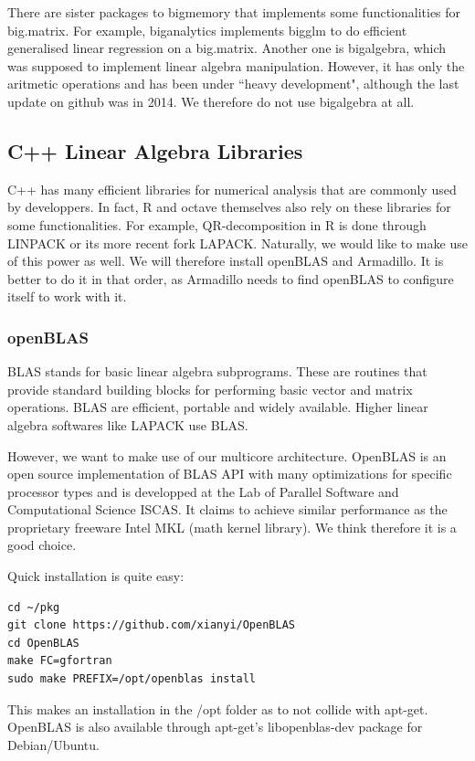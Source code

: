 \documentclass[a4paper,11pt]{amsart}
\begin{document}
There are sister packages to bigmemory that implements some functionalities for big.matrix. For example, biganalytics implements bigglm to do efficient generalised linear regression on a big.matrix. Another one is bigalgebra, which was supposed to implement linear algebra manipulation. However, it has only the aritmetic operations and has been under ``heavy development", although the last update on github was in 2014. We therefore do not use bigalgebra at all. 

\subsection{C++ Linear Algebra Libraries}
C++ has many efficient libraries for numerical analysis that are commonly used by developpers. In fact, R and octave themselves also rely on these libraries for some functionalities. For example, QR-decomposition in R is done through LINPACK or its more recent fork LAPACK. Naturally, we would like to make use of this power as well. We will therefore install openBLAS and Armadillo. It is better to do it in that order, as Armadillo needs to find openBLAS to configure itself to work with it.

\subsubsection{openBLAS} 
BLAS stands for basic linear algebra subprograms. These are routines that provide standard building blocks for performing basic vector and matrix operations. BLAS are efficient, portable and widely available. Higher linear algebra softwares like LAPACK use BLAS. 

However, we want to make use of our multicore architecture. OpenBLAS is an open source implementation of BLAS API with many optimizations for specific processor types and is developped at the Lab of Parallel Software and Computational Science ISCAS. It claims to achieve similar performance as the proprietary freeware Intel MKL (math kernel library). We think therefore it is a good choice.

Quick installation is quite easy:
\begin{verbatim}
cd ~/pkg
git clone https://github.com/xianyi/OpenBLAS
cd OpenBLAS
make FC=gfortran
sudo make PREFIX=/opt/openblas install
\end{verbatim}
This makes an installation in the /opt folder as to not collide with apt-get. OpenBLAS is also available through apt-get's libopenblas-dev package for Debian/Ubuntu. 
\end{document}

